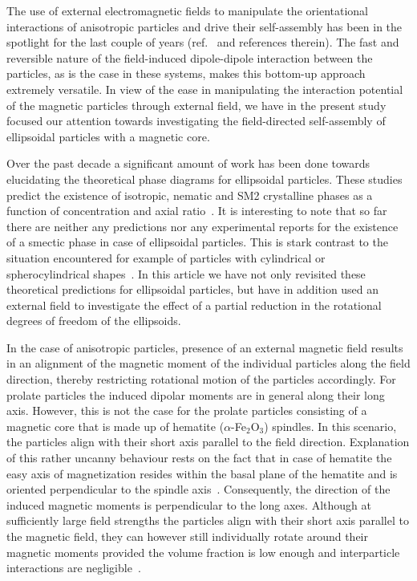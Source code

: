 \documentclass[aps,prl,preprint,superscriptaddress]{revtex4-1} %
\begin{document}
The use of external electromagnetic fields to manipulate the orientational interactions of anisotropic particles and drive their self-assembly has been in the spotlight for the last couple of years (ref.~\cite{op2013phase, Schurtenberger2016, ganesan2017high, shah2015actuation} and references therein). The fast and reversible nature of the field-induced dipole-dipole interaction between the particles, as is the case in these systems, makes this bottom-up approach extremely versatile. In view of the ease in manipulating the interaction potential of the magnetic particles through external field, we have in the present study focused our attention towards investigating the field-directed self-assembly of ellipsoidal particles with a magnetic core.\par
Over the past decade a significant amount of work has been done towards elucidating the theoretical phase diagrams for ellipsoidal particles. These studies predict the existence of isotropic, nematic and SM2 crystalline phases as a function of concentration and axial ratio~\cite{radu2009solid, odriozola2012revisiting, pfleiderer2008crystal}. It is interesting to note that so far there are neither any predictions nor any experimental reports for the existence of a smectic phase in case of ellipsoidal particles. This is stark contrast to the situation encountered for example of particles with cylindrical or spherocylindrical shapes~\cite{Bolhuis1997, lekkerkerker2013liquid}. In this article we have not only revisited these theoretical predictions for ellipsoidal particles, but have in addition used an external field to investigate the effect of a partial reduction in the rotational degrees of freedom of the ellipsoids.\par
In the case of anisotropic particles, presence of an external magnetic field results in an alignment of the magnetic moment of the individual particles along the field direction, thereby restricting rotational motion of the particles accordingly. For prolate particles the induced dipolar moments are in general along their long axis. However, this is not the case for the prolate particles consisting of a magnetic core that is made up of hematite ($\alpha$-Fe$_2$O$_3$) spindles. In this scenario, the particles align with their short axis parallel to the field direction. Explanation of this rather uncanny behaviour rests on the fact that in case of hematite the easy axis of magnetization resides within the basal plane of the hematite and is oriented perpendicular to the spindle axis~\cite{reufer2011magnetization}. Consequently, the direction of the induced magnetic moments is perpendicular to the long axes. Although at sufficiently large field strengths the particles align with their short axis parallel to the magnetic field, they can however still individually rotate around their magnetic moments provided the volume fraction is low enough and interparticle interactions are negligible~\cite{reufer2010morphology}. \par
\end{document}

